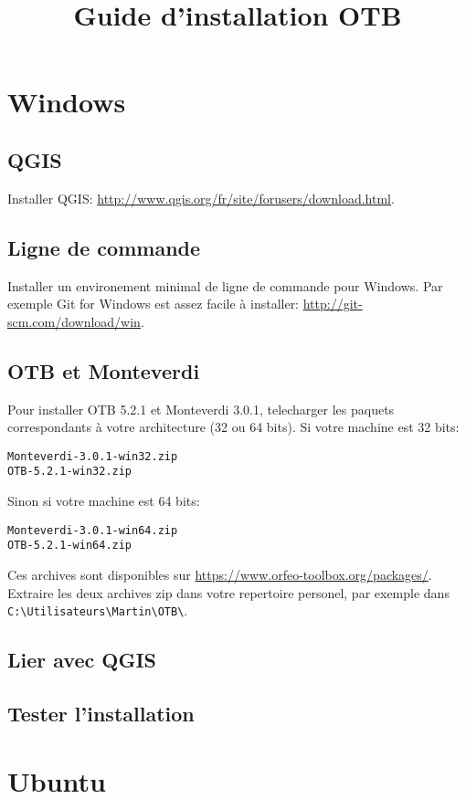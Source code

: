 \documentclass[12pt,a4paper]{article}
\title{Guide d'installation OTB}
\begin{document}
\maketitle

\section{Windows}

\subsection{QGIS}
Installer QGIS: \url{http://www.qgis.org/fr/site/forusers/download.html}.

\subsection{Ligne de commande}
Installer un environement minimal de ligne de commande pour Windows. Par exemple
Git for Windows est assez facile à installer:
\url{http://git-scm.com/download/win}.

\subsection{OTB et Monteverdi}

Pour installer OTB 5.2.1 et Monteverdi 3.0.1, telecharger les paquets
correspondants à votre architecture (32 ou 64 bits). Si votre machine est 32
bits:
\begin{verbatim}
Monteverdi-3.0.1-win32.zip
OTB-5.2.1-win32.zip
\end{verbatim}

Sinon si votre machine est 64 bits:
\begin{verbatim}
Monteverdi-3.0.1-win64.zip
OTB-5.2.1-win64.zip
\end{verbatim}

Ces archives sont disponibles sur \url{https://www.orfeo-toolbox.org/packages/}.
Extraire les deux archives zip dans votre repertoire personel, par exemple dans \texttt{C:{\textbackslash}Utilisateurs{\textbackslash}Martin{\textbackslash}OTB{\textbackslash}}.

\subsection{Lier avec QGIS}

\subsection{Tester l'installation}

\clearpage
\section{Ubuntu}
\end{document}
